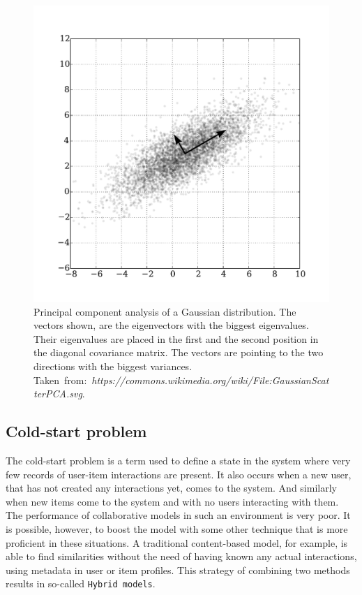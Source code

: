 \begin{figure}[H]
    \centering
    \includegraphics[scale=0.48]{obrazky-figures/pca.pdf}
    \caption{Principal component analysis of a Gaussian distribution. The vectors shown, are the eigenvectors with the biggest eigenvalues. Their eigenvalues are placed in the first and the second position in the diagonal covariance matrix. The vectors are pointing to the two directions with the biggest variances. Taken~from:~\textit{https://commons.wikimedia.org/wiki/File:GaussianScatterPCA.svg}.}
    \label{pca}
\end{figure}


\subsection*{Cold-start problem}
The cold-start problem is a term used to define a state in the system where very few records of user-item interactions are present. It also occurs when a new user, that has not created any interactions yet, comes to the system. And similarly when new items come to the system and with no users interacting with them. The performance of collaborative models in such an environment is very poor. It is possible, however, to boost the model with some other technique that is more proficient in these situations. A traditional content-based model, for example, is able to find similarities without the need of having known any actual interactions, using metadata in user or item profiles. This strategy of combining two methods results in so-called \texttt{Hybrid models}.


